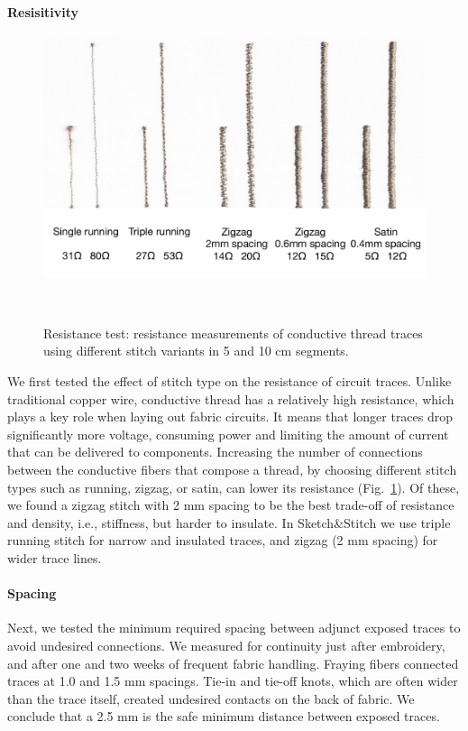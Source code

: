 \documentclass{sigchi}
\begin{document}
\paragraph{Resisitivity}
 \begin{figure}
\centering
  \includegraphics[width=1\columnwidth]{figures/Resistance}
  \caption{Resistance test: resistance measurements of conductive thread traces using different stitch variants in 5 and 10 cm segments.}~\label{fig:Resistance}
  \vspace{-0.5em}
\end{figure}
We first tested the effect of stitch type on the resistance of circuit traces. Unlike traditional copper wire, conductive thread has a relatively high resistance, which plays a key role when laying out fabric circuits. It means that longer traces drop significantly more voltage, consuming power and limiting the amount of current that can be delivered to components. Increasing the number of connections between the conductive fibers that compose a thread, by choosing different stitch types such as running, zigzag, or satin, can lower its resistance (Fig.\  \ref{fig:Resistance}). Of these, we found a zigzag stitch with 2 mm spacing to be the best trade-off of resistance and density, i.e., stiffness, but harder to insulate. In Sketch\&Stitch we use triple running stitch for narrow and insulated traces, and zigzag (2 mm spacing) for wider trace lines. 

\paragraph{Spacing}
Next, we tested the minimum required spacing between adjunct exposed traces to avoid undesired connections. We measured for continuity just after embroidery, and after one and two weeks of frequent fabric handling. Fraying fibers connected traces at 1.0 and 1.5 mm spacings. Tie-in and tie-off knots, which are often wider than the trace itself, created undesired contacts on the back of fabric. We conclude that a 2.5 mm is the safe minimum distance between exposed traces.
\end{document}

